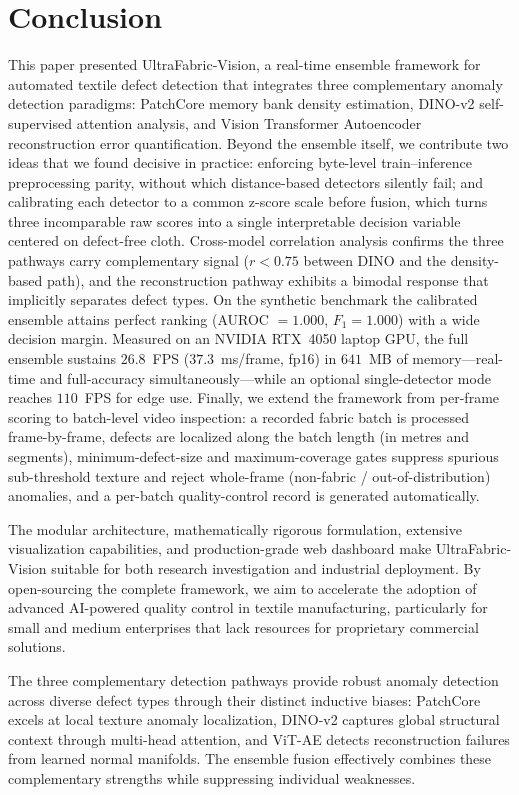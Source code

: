 \documentclass[journal]{IEEEtran}
\begin{document}
\section{Conclusion}
\label{sec:conclusion}

This paper presented UltraFabric-Vision, a real-time ensemble framework for automated textile defect detection that integrates three complementary anomaly detection paradigms: PatchCore memory bank density estimation, DINO-v2 self-supervised attention analysis, and Vision Transformer Autoencoder reconstruction error quantification. Beyond the ensemble itself, we contribute two ideas that we found decisive in practice: enforcing byte-level train--inference preprocessing parity, without which distance-based detectors silently fail; and calibrating each detector to a common z-score scale before fusion, which turns three incomparable raw scores into a single interpretable decision variable centered on defect-free cloth. Cross-model correlation analysis confirms the three pathways carry complementary signal ($r < 0.75$ between DINO and the density-based path), and the reconstruction pathway exhibits a bimodal response that implicitly separates defect types. On the synthetic benchmark the calibrated ensemble attains perfect ranking (AUROC $= 1.000$, $F_1 = 1.000$) with a wide decision margin. Measured on an NVIDIA RTX~4050 laptop GPU, the full ensemble sustains $26.8$~FPS ($37.3$~ms/frame, fp16) in $641$~MB of memory---real-time and full-accuracy simultaneously---while an optional single-detector mode reaches $110$~FPS for edge use. Finally, we extend the framework from per-frame scoring to batch-level video inspection: a recorded fabric batch is processed frame-by-frame, defects are localized along the batch length (in metres and segments), minimum-defect-size and maximum-coverage gates suppress spurious sub-threshold texture and reject whole-frame (non-fabric / out-of-distribution) anomalies, and a per-batch quality-control record is generated automatically.

The modular architecture, mathematically rigorous formulation, extensive visualization capabilities, and production-grade web dashboard make UltraFabric-Vision suitable for both research investigation and industrial deployment. By open-sourcing the complete framework, we aim to accelerate the adoption of advanced AI-powered quality control in textile manufacturing, particularly for small and medium enterprises that lack resources for proprietary commercial solutions.

The three complementary detection pathways provide robust anomaly detection across diverse defect types through their distinct inductive biases: PatchCore excels at local texture anomaly localization, DINO-v2 captures global structural context through multi-head attention, and ViT-AE detects reconstruction failures from learned normal manifolds. The ensemble fusion effectively combines these complementary strengths while suppressing individual weaknesses.
\end{document}
